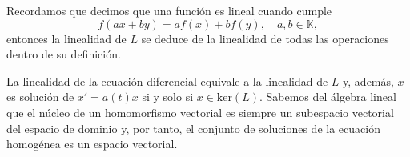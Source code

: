 \documentclass[../main.tex]{subfiles}
\begin{document}
Recordamos que decimos que una función es lineal cuando cumple
\[f(ax + by) = af(x) + bf(y), \quad a, b \in \mathbb{K},\]
entonces la linealidad de \(L\) se deduce de la linealidad de todas las
operaciones dentro de su definición.

\begin{remark}
La linealidad de la ecuación diferencial equivale a la linealidad de
\(L\) y, además, \(x\) es solución de \(x' = a(t)x\) si y solo si
\(x \in \text{ker}(L)\). Sabemos del álgebra lineal que el núcleo de un
homomorfismo vectorial es siempre un subespacio vectorial del espacio de dominio
y, por tanto, el conjunto de soluciones de la ecuación homogénea es un espacio
vectorial.
\end{remark}
\end{document}
